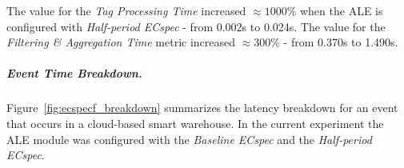 

The value for the \textit{Tag Processing Time} increased $\approx1000\%$ when the \gls{ALE} is configured
with \textit{Half-period ECspec} - from 0.002s to 0.024s. The value for the \textit{Filtering \& Aggregation Time}
metric increased $\approx300\%$ - from 0.370s to 1.490s.

\subparagraph{Event Time Breakdown.}
\label{subp:cloud_event_breakdown}
Figure~\ref{fig:ecspecf_breakdown} summarizes the latency breakdown for an event that occurs in a cloud-based
smart warehouse. In the current experiment the \gls{ALE} module was configured with the
\textit{Baseline ECspec} and the \textit{Half-period ECspec}.\\


